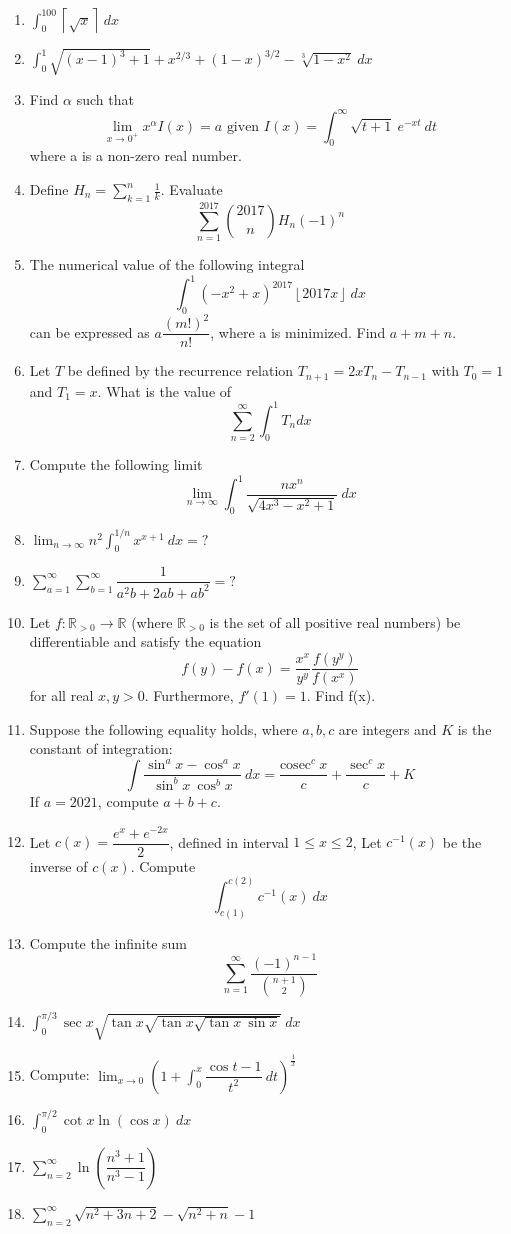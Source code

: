\documentclass[12pt,a4paper,twoside]{book}
\newcommand{\dint}[1]{\displaystyle{\int #1 \  dx}}
\begin{document}
\begin{enumerate}
	\item $\dint{_0^{100} \left\lceil \sqrt x \right\rceil}$
	\item $\dint{_0^1 \sqrt{(x-1)^3+1}+x^{2/3}+(1-x)^{3/2}-\sqrt[3]{1-x^2}}$
	\item Find $\alpha$ such that
	$$\lim_{x\to0^+}x^\alpha I(x)=a\text{ given } I(x)=\int_0^\infty \sqrt{t+1}\ e^{-xt}\ dt$$
	where a is a non-zero real number.
	\item Define $\displaystyle{H_n=\sum_{k=1}^n \frac{1}{k}}$. Evaluate 
	$$\sum_{n=1}^{2017}\binom {2017}nH_n (-1)^n$$
	\item The numerical value of the following integral
	$$\dint{_0^1(-x^2+x)^{2017} \left\lfloor 2017x\right\rfloor}$$ can be expressed as $a\dfrac{(m!)^2}{n!}$, where a is minimized. Find $a+m+n$.
	\item Let $T$ be defined by the recurrence relation $T_{n+1}= 2xT_n - T_{n-1}$ with $T_0 = 1$ and $T_1 = x$. What is the value of
	$$\sum_{n=2}^\infty \int_0^1T_n dx$$
	\item Compute the following limit
	$$\lim_{n\to\infty} \int_0^1 \frac{nx^n}{\sqrt{4x^3-x^2+1}}\ dx$$
	\item $\displaystyle{\lim_{n\to\infty}n^2 \int_0^{1/n}x^{x+1}\ dx}=?$
	\item $\displaystyle{\sum_{a=1}^\infty\sum_{b=1}^\infty \dfrac{1}{a^2b+2ab+ab^2}}=?$
	\item Let $f : \mathbb {R}_{>0} \to \mathbb {R}$ (where $\mathbb {R}_{>0}$ is the set of all positive real numbers) be differentiable and satisfy
the equation 
$$ f(y)-f(x)=\frac{x^x}{y^y}\frac{f(y^y)}{f(x^x)}$$
for all real $x, y > 0$. Furthermore, $f'(1) = 1$. Find f(x).
\item Suppose the following equality holds, where $a, b, c$ are integers and $K$ is the constant of integration:
$$ \int \dfrac{\sin^a x -\cos^a x}{\sin^b x \ \cos^b x}\ dx=\dfrac{\text{cosec}^c \ x}{c}+\dfrac{\sec^c x}{c}+K$$
If $a = 2021$, compute $a + b + c$.
	\item Let $c(x)=\dfrac{e^x+e^{-2x}}{2}$, defined in interval $1\leq x\leq 2$, Let $c^{-1}(x)$ be the inverse of $c(x)$.
Compute
$$\int_{c(1)}^{c(2)}c^{-1}(x)\ dx$$
	\item  Compute the infinite sum $$\sum_{n=1}^\infty \dfrac{(-1)^{n-1}}{\binom{n+1}{2}}$$
	\item $\dint{_0^{\pi/3}\sec x \sqrt{\tan x \sqrt{\tan x \sqrt{\tan x\ \sin x}}}}$
	\item Compute: $\displaystyle{\lim_{x\to 0}\left( 1+\int_0^x \dfrac{\cos t -1}{t^2}\ dt\right)^\frac{1}{x}}$
	\item $\dint{_0^{\pi/2} \cot x \ln{(\cos x)}}$
	\item $\displaystyle{\sum_{n=2}^\infty \ln{\left(\dfrac{n^3+1}{n^3-1}\right)}}$
	\item $\displaystyle{\sum_{n=2}^\infty \sqrt{n^2+3n+2}-\sqrt{n^2+n}-1}$
	

\end{enumerate}
\end{document}
